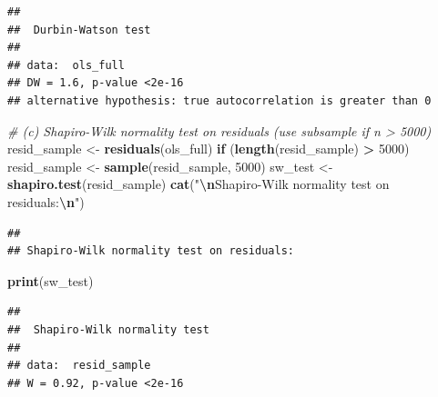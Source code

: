 \documentclass[
]{article}
\newenvironment{Shaded}{\begin{snugshade}}{\end{snugshade}}
\newcommand{\CommentTok}[1]{\textcolor[rgb]{0.56,0.35,0.01}{\textit{#1}}}
\newcommand{\ControlFlowTok}[1]{\textcolor[rgb]{0.13,0.29,0.53}{\textbf{#1}}}
\newcommand{\DecValTok}[1]{\textcolor[rgb]{0.00,0.00,0.81}{#1}}
\newcommand{\FunctionTok}[1]{\textcolor[rgb]{0.13,0.29,0.53}{\textbf{#1}}}
\newcommand{\NormalTok}[1]{#1}
\newcommand{\OtherTok}[1]{\textcolor[rgb]{0.56,0.35,0.01}{#1}}
\newcommand{\SpecialCharTok}[1]{\textcolor[rgb]{0.81,0.36,0.00}{\textbf{#1}}}
\newcommand{\StringTok}[1]{\textcolor[rgb]{0.31,0.60,0.02}{#1}}
\begin{document}
\begin{verbatim}
## 
##  Durbin-Watson test
## 
## data:  ols_full
## DW = 1.6, p-value <2e-16
## alternative hypothesis: true autocorrelation is greater than 0
\end{verbatim}

\begin{Shaded}
\begin{Highlighting}[]
\CommentTok{\# (c) Shapiro{-}Wilk normality test on residuals (use subsample if n \textgreater{} 5000)}
\NormalTok{resid\_sample }\OtherTok{\textless{}{-}} \FunctionTok{residuals}\NormalTok{(ols\_full)}
\ControlFlowTok{if}\NormalTok{ (}\FunctionTok{length}\NormalTok{(resid\_sample) }\SpecialCharTok{\textgreater{}} \DecValTok{5000}\NormalTok{) resid\_sample }\OtherTok{\textless{}{-}} \FunctionTok{sample}\NormalTok{(resid\_sample, }\DecValTok{5000}\NormalTok{)}
\NormalTok{sw\_test }\OtherTok{\textless{}{-}} \FunctionTok{shapiro.test}\NormalTok{(resid\_sample)}
\FunctionTok{cat}\NormalTok{(}\StringTok{"}\SpecialCharTok{\textbackslash{}n}\StringTok{Shapiro{-}Wilk normality test on residuals:}\SpecialCharTok{\textbackslash{}n}\StringTok{"}\NormalTok{)}
\end{Highlighting}
\end{Shaded}

\begin{verbatim}
## 
## Shapiro-Wilk normality test on residuals:
\end{verbatim}

\begin{Shaded}
\begin{Highlighting}[]
\FunctionTok{print}\NormalTok{(sw\_test)}
\end{Highlighting}
\end{Shaded}

\begin{verbatim}
## 
##  Shapiro-Wilk normality test
## 
## data:  resid_sample
## W = 0.92, p-value <2e-16
\end{verbatim}
\end{document}
